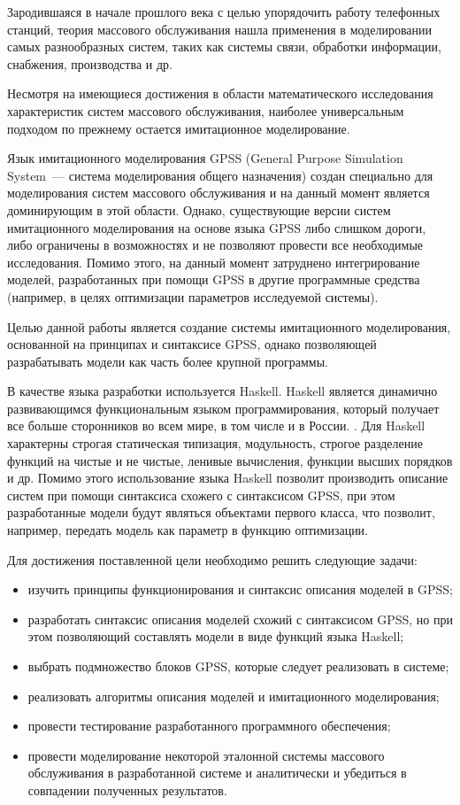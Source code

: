 \Introduction

Зародившаяся в начале прошлого века с целью упорядочить работу телефонных станций, теория массового обслуживания нашла применения в моделировании самых разнообразных систем, таких как системы связи, обработки информации, снабжения, производства и др.

Несмотря на имеющиеся достижения в области математического исследования характеристик систем массового обслуживания, наиболее универсальным подходом по прежнему остается имитационное моделирование.

Язык имитационного моделирования GPSS (General Purpose Simulation System~--- система моделирования общего назначения) создан специально для моделирования систем массового обслуживания и на данный момент является доминирующим в этой области. Однако, существующие версии систем имитационного моделирования на основе языка GPSS либо слишком дороги, либо ограничены в возможностях и не позволяют провести все необходимые исследования.\cite{KST} Помимо этого, на данный момент затруднено интегрирование моделей, разработанных при помощи GPSS в другие программные средства (например, в целях оптимизации параметров исследуемой системы).

Целью данной работы является создание системы имитационного моделирования, основанной на принципах и синтаксисе GPSS, однако позволяющей разрабатывать модели как часть более крупной программы.

В качестве языка разработки используется  Haskell. Haskell является динамично развивающимся функциональным языком программирования, который получает все больше сторонников во всем мире, в том числе и в России. \cite{HaskellRef}. Для Haskell характерны строгая статическая типизация, модульность, строгое разделение функций на чистые и не чистые, ленивые вычисления, функции высших порядков и др.\cite{Haskell} Помимо этого использование языка Haskell позволит производить описание систем при помощи синтаксиса схожего с синтаксисом GPSS, при этом разработанные модели будут являться объектами первого класса, что позволит, например, передать модель как параметр в функцию оптимизации.

Для достижения поставленной цели необходимо решить следующие задачи:
\begin{itemize}
\item изучить принципы функционирования и синтаксис описания моделей в GPSS;
\item разработать синтаксис описания моделей схожий с синтаксисом GPSS, но при этом позволяющий составлять модели в виде функций языка Haskell;
\item выбрать подмножество блоков GPSS, которые следует реализовать в системе;
\item реализовать алгоритмы описания моделей и имитационного моделирования;
\item провести тестирование разработанного программного обеспечения;
\item провести моделирование некоторой эталонной системы массового обслуживания в разработанной системе и аналитически и убедиться в совпадении полученных результатов.
\end{itemize}

